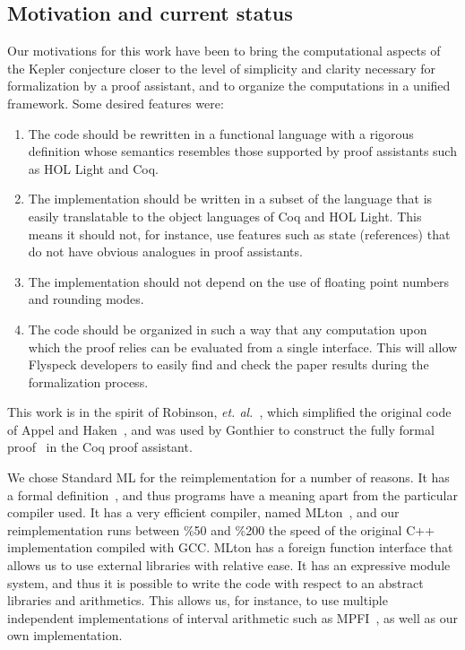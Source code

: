 \documentclass[11pt]{amsart}
\begin{document}

\subsection*{Motivation and current status}
\label{sec:sean}

Our motivations for this work have been to bring the computational
aspects of the Kepler conjecture closer to the level of simplicity and
clarity necessary for formalization by a proof assistant, and to
organize the computations in a unified framework.  Some desired
features were:

\begin{enumerate}
\item The code should be rewritten in a functional language with a
  rigorous definition whose semantics resembles those supported by
  proof assistants such as HOL Light and Coq.
\item The implementation should be written in a subset of the language
  that is easily translatable to the object languages of Coq and HOL
  Light. This means it should not, for instance, use features such as state
  (references) that do not have obvious analogues in proof assistants.
\item The implementation should not depend on the use of floating
  point numbers and rounding modes.
\item The code should be organized in such a way that any
  computation upon which the proof relies can be evaluated from a single
  interface.  This will allow Flyspeck developers to easily find and
  check the paper results during the formalization process.
\end{enumerate} 

\noindent This
work is in the spirit of Robinson, \textit{et.
al.}~\cite{Robertson:1997:JCTB}, which simplified the original code of
Appel and Haken~\cite{Appel:1986:FourColor}, and was used by Gonthier to
construct the fully formal proof~\cite{gonthier:2008:formal} in the
Coq proof assistant. 

We chose Standard ML for the reimplementation for a number of reasons.
It has a formal definition~\cite{Milner:1990:SML}, and thus programs
have a meaning apart from the particular compiler used. 
It has a very efficient compiler, named MLton~\cite{website:MLton}, and 
our reimplementation runs between \%50 and \%200 the speed
of the original C++ implementation compiled with GCC.
MLton has a foreign function interface that allows us to use external
libraries with relative ease. It has an expressive module system, and
thus it is possible to write the code with respect to an abstract
libraries and arithmetics. This allows us, for instance, to use
multiple independent implementations of interval arithmetic such as
MPFI~\cite{Revol:2005:MPFI}, as well as our own implementation.
\end{document}
